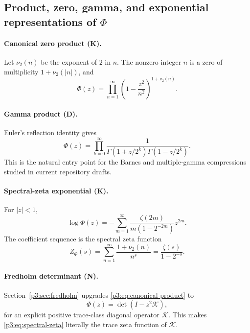 \documentclass[11pt]{article}
\theoremstyle{definition}
\theoremstyle{remark}
\newcommand{\cK}{\mathcal K}
\newcommand{\statusknown}{\textsf{K}}
\newcommand{\statusderived}{\textsf{D}}
\newcommand{\statusnew}{\textsf{N}}
\begin{document}
\subsection{Product, zero, gamma, and exponential representations of \(\Phi\)}

\paragraph{Canonical zero product (\statusknown).}
Let \(\nu_2(n)\) be the exponent of \(2\) in \(n\).  The nonzero integer \(n\) is a zero of
multiplicity \(1+\nu_2(|n|)\), and
\begin{equation}
 \Phi(z)=\prod_{n=1}^{\infty}
 \left(1-\frac{z^2}{n^2}\right)^{1+\nu_2(n)}.                \label{p3:eq:canonical-product}
\end{equation}

\paragraph{Gamma product (\statusderived).}
Euler's reflection identity gives
\begin{equation}
 \Phi(z)=\prod_{k=0}^{\infty}
 \frac{1}{\Gamma(1+z/2^k)\Gamma(1-z/2^k)}.                  \label{p3:eq:gamma-product}
\end{equation}
This is the natural entry point for the Barnes and multiple-gamma compressions studied in
current repository drafts.

\paragraph{Spectral-zeta exponential (\statusknown).}
For \(|z|<1\),
\begin{equation}
 \log\Phi(z)
 =-\sum_{m=1}^{\infty}
 \frac{\zeta(2m)}{m(1-2^{-2m})}z^{2m}.                       \label{p3:eq:logPhi-zeta}
\end{equation}
The coefficient sequence is the spectral zeta function
\begin{equation}
 Z_{\Phi}(s)=\sum_{n=1}^{\infty}\frac{1+\nu_2(n)}{n^s}
 =\frac{\zeta(s)}{1-2^{-s}}.                                \label{p3:eq:spectral-zeta}
\end{equation}

\paragraph{Fredholm determinant (\statusnew).}
Section~\ref{p3:sec:fredholm} upgrades \eqref{p3:eq:canonical-product} to
\begin{equation}
 \Phi(z)=\det(I-z^2\cK),                                    \label{p3:eq:fredholm-preview}
\end{equation}
for an explicit positive trace-class diagonal operator \(\cK\).  This makes
\eqref{p3:eq:spectral-zeta} literally the trace zeta function of \(\cK\).
\end{document}
